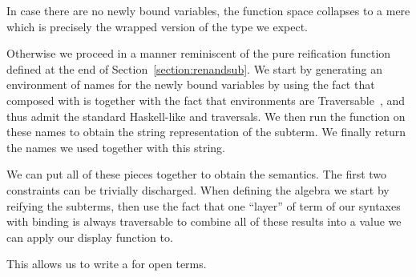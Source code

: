 \begin{agdasnippet}
\end{agdasnippet}

In case there are no newly bound variables, the  function space
collapses to a mere  which is precisely the wrapped version of
the type we expect.

\begin{agdasnippet}
\end{agdasnippet}

Otherwise we proceed in a manner reminiscent of the pure reification function
defined at the end of Section~\ref{section:renandsub}. We start by generating an environment
of names for the newly bound variables by using the fact that  composed
with  is  together with the fact that environments are
Traversable~\cite{mcbride_paterson_2008}, %
and thus admit the standard Haskell-like  and 
traversals. %
We then run the  function
on these names to obtain the string representation of the subterm. We finally
return the names we used together with this string.

\begin{agdasnippet}
\end{agdasnippet}

We can put all of these pieces together to obtain the  semantics.
The first two constraints can be trivially discharged. When defining the
algebra we start by reifying the subterms, then use the fact that  one ``layer''
of term of our syntaxes with binding is always traversable to combine all of
these results into a value we can apply our display function to.

\begin{agdasnippet}
\end{agdasnippet}

This allows us to write a  for open terms.

\begin{agdasnippet}
\end{agdasnippet}

